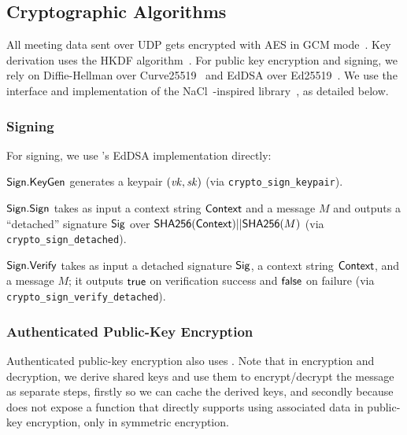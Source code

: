 \subsection{Cryptographic Algorithms}\label{subsec:cryptoalgs}

All meeting data sent over UDP gets encrypted with AES in GCM mode~\cite{sp80038d}.
%
Key derivation uses the HKDF algorithm~\cite{rfc5869}.
%
For public key encryption and signing, we rely on Diffie-Hellman over Curve25519~\cite{bernstein2006curve25519} and EdDSA over Ed25519~\cite{eddsa}.
%
We use the interface and implementation of the NaCl~\cite{nacl}-inspired \sodium{} library~\cite{libsodium}, as detailed below.

\subsubsection{Signing}

For signing, we use \sodium 's EdDSA implementation directly:
%
\begin{itemize*}
   \item ${\sf Sign}.\mathsf{KeyGen}$ generates a keypair $(\mathit{vk}, \mathit{sk})$ (via \texttt{crypto\_sign\_keypair}).
   \item ${\sf Sign}.\mathsf{Sign}$ takes as input a context string ${\sf Context}$ and a message $M$ and outputs a ``detached'' signature
   ${\sf Sig}$ over ${\sf SHA256}({\sf Context}) || {\sf SHA256}(M)$ (via \texttt{crypto\_sign\_detached}).
   \item ${\sf Sign}.\mathsf{Verify}$ takes as input a detached signature ${\sf Sig}$, a context string ${\sf Context}$, and a message $M$; it outputs $\mathsf{true}$ on verification success
   and $\mathsf{false}$ on failure
   (via \texttt{crypto\_\-sign\_\-verify\_\-detached}).
\end{itemize*}

\subsubsection{Authenticated Public-Key Encryption}

Authenticated public-key encryption also uses \sodium. Note that in encryption
and decryption, we derive shared keys and use them to encrypt/decrypt the
message as separate steps, firstly so we can cache the derived keys, and
secondly because \sodium{} does not expose a function that directly supports
using associated data in public-key encryption, only in symmetric encryption.


